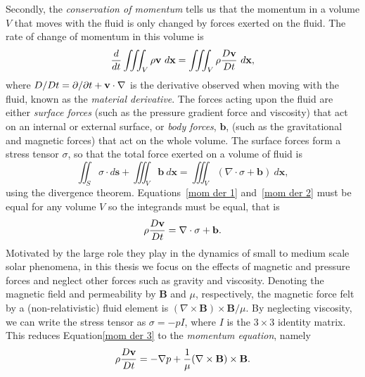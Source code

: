 Secondly, the \textit{conservation of momentum} tells us that the momentum in a volume $V$ that moves with the fluid is only changed by forces exerted on the fluid. The rate of change of momentum in this volume is
\begin{equation}
	\frac{d}{dt} \iiint_V \rho\mathbf{v} ~d\mathbf{x} = \iiint_V \rho\frac{D\mathbf{v}}{Dt} ~d\mathbf{x}, \label{mom der 1}
\end{equation}
where $D/Dt = \partial/\partial t + \mathbf{v}\cdot\nabla$ is the derivative observed when moving with the fluid, known as the \textit{material derivative}. The forces acting upon the fluid are either \textit{surface forces} (such as the pressure gradient force and viscosity) that act on an internal or external surface, or \textit{body forces}, $\mathbf{b}$, (such as the gravitational and magnetic forces) that act on the whole volume. The surface forces form a stress tensor $\sigma$, so that the total force exerted on a volume of fluid is
\begin{equation}
	\iint_S \sigma\cdot d\mathbf{s} + \iiint_V \mathbf{b} ~d\mathbf{x} = \iiint_V (\nabla\cdot \sigma + \mathbf{b}) ~d\mathbf{x}, \label{mom der 2}
\end{equation}
using the divergence theorem. Equations~\eqref{mom der 1} and~\eqref{mom der 2} must be equal for any volume $V$ so the integrands must be equal, that is
\begin{equation}
\rho\frac{D\mathbf{v}}{Dt} = \nabla\cdot \sigma + \mathbf{b}. \label{mom der 3}
\end{equation}
Motivated by the large role they play in the dynamics of small to medium scale solar phenomena, in this thesis we focus on the effects of magnetic and pressure forces and neglect other forces such as gravity and viscosity. Denoting the magnetic field and permeability by $\mathbf{B}$ and $\mu$, respectively, the magnetic force felt by a (non-relativistic) fluid element is $(\nabla\times\mathbf{B})\times\mathbf{B}/\mu$. By neglecting viscosity, we can write the stress tensor as $\sigma = -pI$, where $I$ is the $3\times3$ identity matrix. This reduces Equation\eqref{mom der 3} to the \textit{momentum equation}, namely
\begin{equation}
\rho\frac{D\mathbf{v}}{Dt} = -\nabla p + \frac{1}{\mu}(\nabla\times\mathbf{B})\times\mathbf{B}. \label{mom eqn}
\end{equation}

